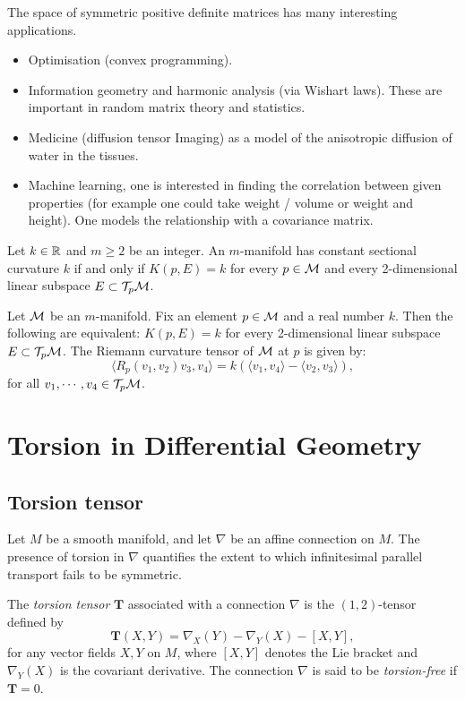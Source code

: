 The space of symmetric positive definite matrices has many interesting applications. 
\begin{itemize}
    \item Optimisation (convex programming).
\item Information geometry and harmonic analysis (via Wishart laws). These are important in random matrix theory and statistics.
\item Medicine (diffusion tensor Imaging) as a model of the anisotropic diffusion of water in the tissues. 
\item Machine learning, one is interested in finding the correlation between given properties (for example one could take weight / volume or weight and height). One models the relationship with a covariance matrix.
\end{itemize}
\begin{definition}
Let $k\in \mathbb{R}$ and $m\geq 2$ be an integer. An $m$-manifold has constant sectional curvature 
$k$ if and only if $K(p,E)=k$ for every $p\in \mathcal{M}$ and every 2-dimensional linear subspace $E\subset \mathcal{T}_p\mathcal{M}$.    
\end{definition}

\begin{theorem}
  Let $\mathcal{M}$ be an $m$-manifold. Fix an element $p\in \mathcal{M}$ and a real number $k$. Then the following are equivalent:
$K(p,E)=k$ for every 2-dimensional linear subspace $E\subset \mathcal{T}_p\mathcal{M}$.
The Riemann curvature tensor of $\mathcal{M}$ at $p$ is given by:
\[\langle R_p(v_1,v_2)v_3,v_4\rangle=k(\langle v_1,v_4\rangle-\langle v_2,v_3\rangle),\]
for all $v_1,\cdots, v_4 \in \mathcal{T}_p\mathcal{M}$.
  
\end{theorem} 

\section{Torsion in Differential Geometry}
\subsection{Torsion tensor}

Let $M$ be a smooth manifold, and let $\nabla$ be an affine connection on $M$. The presence of torsion in $\nabla$ quantifies the extent to which infinitesimal parallel transport fails to be symmetric.

\begin{definition}
The \emph{torsion tensor} $\boldsymbol{T}$ associated with a connection $\nabla$ is the $(1,2)$-tensor defined by
\[
\boldsymbol{T}(X,Y) = \nabla_X (Y) - \nabla_Y (X) - [X,Y],
\]
for any vector fields $X,Y$ on $M$, where $[X,Y]$ denotes the Lie bracket and $\nabla_Y (X)$ is the covariant derivative. The connection $\nabla$ is said to be \emph{torsion-free} if $\boldsymbol{T}=0$.
\end{definition}

